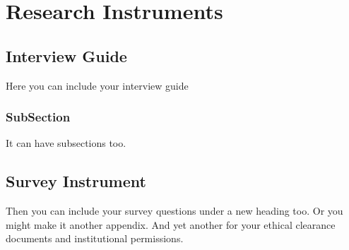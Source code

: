\chapter{Research Instruments}
\label{chp:res-inst}

\section{Interview Guide}
\label{sec:int-guide}

Here you can include your interview guide
\subsection{SubSection}

It can have subsections too.

\section{Survey Instrument}

Then you can include your survey questions under a new heading too. Or you might make it another appendix. And yet another for your ethical clearance documents and institutional permissions.

\endinput
